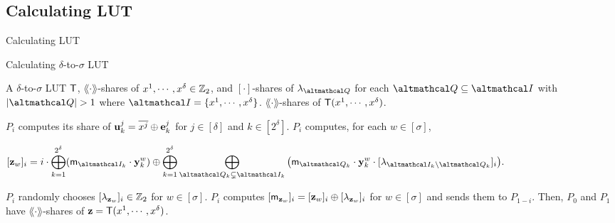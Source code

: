 \documentclass[../240906_cryptlab_flute.tex]{subfiles}
\begin{document}
\subsection{Calculating LUT}
\begin{frame}{Calculating LUT}
    \begin{block}{Calculating \(\delta\)-to-\(\sigma\) LUT}
        \begin{description}[Output]
            \ii[Input]
            A \(\delta\)-to-\(\sigma\) LUT \(\mathsf{T}\),
            \(\lang\cdot\rang\)-shares of \(x^1, \cdots, x^\delta \in \mathbb{Z}_2\), and
            \([\cdot]\)-shares of \(\lambda_{\mcal{Q}}\) for each \(\mcal{Q} \subseteq \mcal{I}\)
            with \(|\mcal{Q}| > 1\) where \(\mcal{I} = \{x^1,\cdots,x^\delta\}\).
            \ii[Output]
            \(\lang\cdot\rang\)-shares of \(\mathsf{T}(x^1, \cdots, x^\delta)\).
        \end{description}
        \pause
        \begin{enumerate}
            \ii
            \(P_i\) computes its share of \(\boldsymbol{\mathbf{u}}^j_k = \overline{x^j} \oplus \boldsymbol{\mathbf{e}}^j_k\)
            for \(j \in [\delta]\) and \(k \in [2^\delta]\).
            \pause
            \ii
            \(P_i\) computes, for each \(w \in [\sigma]\),
            \centerline{%
                \(\displaystyle
                [\vec{z}_w]_i = i \cdot \bigoplus_{k=1}^{2^\delta} (\msf{m}_{\mcal{I}_k} \cdot \vec{y}^w_k)
                \oplus \bigoplus_{k=1}^{2^\delta} \bigoplus_{\mcal{Q}_k \subsetneq \mcal{I}_k} \big( \msf{m}_{\mcal{Q}_k} \cdot \vec{y}^w_k
                \cdot [\lambda_{\mcal{I}_k \setminus \mcal{Q}_k}]_i \big).
                \)
            }
            \pause
            \ii
            \(P_i\) randomly chooses \([\lambda_{\boldsymbol{\mathbf{z}}_w}]_i \in \mathbb{Z}_2\) for \(w \in [\sigma]\).
            \ii
            \(P_i\) computes \([\mathsf{m}_{\boldsymbol{\mathbf{z}}_w}]_i = [\boldsymbol{\mathbf{z}}_w]_i \oplus [\lambda_{\boldsymbol{\mathbf{z}}_w}]_i\)
            for \(w \in [\sigma]\) and sends them to \(P_{1-i}\).
            \ii
            Then, \(P_0\) and \(P_1\) have \(\lang\cdot\rang\)-shares of \(\boldsymbol{\mathbf{z}} = \mathsf{T}(x^1, \cdots, x^\delta)\).
        \end{enumerate}
    \end{block}
\end{frame}
\end{document}
